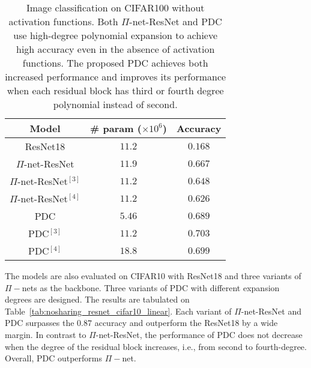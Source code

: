 \documentclass[runningheads]{llncs}
\newcommand{\resnet}{ResNet}
\newcommand{\modelres}{$\Pi$-net-\resnet}
\newcommand{\noshare}{PDC}
\providecommand\ie{i.e.,}
\begin{document}
\begin{table}[h]
\centering
    \caption{Image classification on CIFAR100 without activation functions. Both \modelres{} and \noshare{} use high-degree polynomial expansion to achieve high accuracy even in the absence of activation functions. The proposed \noshare{} achieves both increased performance and improves its performance when each residual block has third or fourth degree polynomial instead of second.}
     \begin{tabular}{|c | c | c|}
         \hline
         \textbf{Model} & \textbf{\# param ($\times 10^6$)} & \textbf{Accuracy}\\
        \hline
         \resnet18 & $11.2$ & $0.168$\\\hline
         \modelres &  $11.9$ & $0.667$\\\hline
         \modelres$^{[3]}$ &  $11.2$ & $0.648$\\\hline
         \modelres$^{[4]}$ &  $11.2$ & $0.626$\\\hline
         \noshare &  $\bm{5.46}$ & $0.689$\\\hline
         \noshare$^{[3]}$ &  $11.2$ & $\bm{0.703}$\\\hline
         \noshare$^{[4]}$ &  $18.8$ & $0.699$\\\hline
     \end{tabular}
 \label{tab:nosharing_resnet_cifar100_linear}
\end{table}


The models are also evaluated on CIFAR10 with \resnet18 and three variants of $\Pi-$nets as the backbone. Three variants of \noshare{} with different expansion degrees are designed. The results are tabulated on Table~\ref{tab:nosharing_resnet_cifar10_linear}. Each variant of \modelres{} and \noshare{} surpasses the $0.87$ accuracy and outperform the \resnet18 by a wide margin. 
In contrast to \modelres{}, the performance of \noshare{} does not decrease when the degree of the residual block increases, \ie{} from second to fourth-degree. Overall, \noshare{} outperforms $\Pi-$net.
\end{document}
